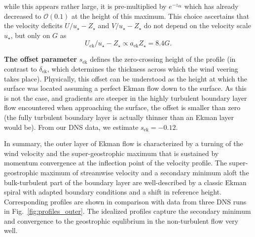 \documentclass[smallcondensed,final]{svjour3}
\begin{document}
while this appears rather large, it is pre-multiplied by $e^{-z_\mathrm{ek}}$ which has already decreased
to $\mathcal{O}(0.1)$ at the height of this maximum.
%
This choice ascertains that the velocity deficits $U/u_\star-Z_\star$ and $V/u_\star-Z_\star$ do not
depend on the velocity scale $u_\star$, but only on $G$ as
\begin{equation}
  U_\mathrm{ek}/u_\star-Z_\star \propto a_\mathrm{ek} Z_\star = 8.4G.
  \label{eqn:hodograph_scaling}
\end{equation}
%
\par
%
\textbf{The offset parameter} $s_\mathrm{ek}$ defines the zero-crossing height of the profile
(in contrast to $\delta_\mathrm{ek}$, which determines the thickness across which the wind veering takes place). 
%
Physically, this offset can be understood as the height at which the surface was located assuming
a perfect Ekman flow down to the surface.
%
As this is not the case, and gradients are steeper in the highly turbulent boundary layer flow encountered
when approaching the surface, the offset is smaller than zero (the fully turbulent boundary layer is
actually thinner than an Ekman layer would be).
%
From our DNS data, we estimate $s_\mathrm{ek}=-0.12$. 
%
\par 
% 
In summary, the outer layer of Ekman flow is characterized by a turning of the wind
velocity and the super-geostrophic maximum that is sustained by momentum convergence
at the inflection point of the velocity profile.
%
The super-geostrophic maximum of streamwise velocity and a secondary minimum aloft the bulk-turbulent part of
the boundary layer are well-described by a classic Ekman spiral with adapted boundary conditions and a shift
in reference height.
%
Corresponding profiles are shown in comparison with data from three DNS runs in Fig.~\ref{fig:profiles_outer}.
The idealized profiles capture the secondary minimum and convergence to the geostrophic equlibrium in the
non-turbulent flow very well.
%
\end{document}
